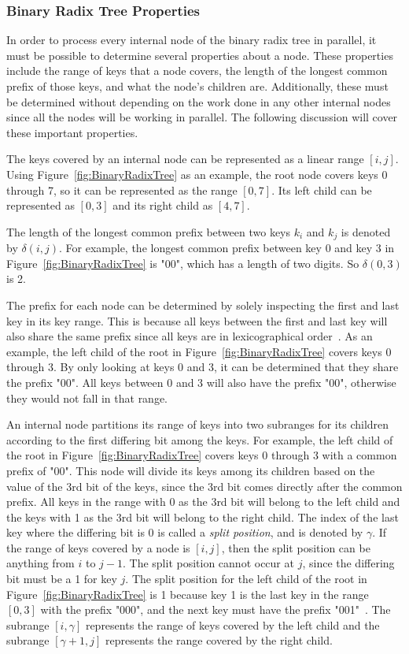 \documentclass{sig-alternate}
\begin{document}
\subsubsection{Binary Radix Tree Properties}
\label{sec:brtProperties}

In order to process every internal node of the binary radix tree in parallel, it must be possible to determine several properties about a node. These properties include the range of keys that a node covers, the length of the longest common prefix of those keys, and what the node's children are. Additionally, these must be determined without depending on the work done in any other internal nodes since all the nodes will be working in parallel. The following discussion will cover these important properties.

The keys covered by an internal node can be represented as a linear range $[i,j]$. Using Figure~\ref{fig:BinaryRadixTree} as an example, the root node covers keys 0 through 7, so it can be represented as the range $[0,7]$. Its left child can be represented as $[0,3]$ and its right child as $[4,7]$.

The length of the longest common prefix between two keys $k_{i}$ and $k_{j}$ is denoted by $\delta(i,j)$. For example, the longest common prefix between key 0 and key 3 in Figure~\ref{fig:BinaryRadixTree} is "00", which has a length of two digits. So $\delta(0,3)$ is 2.

The prefix for each node can be determined by solely inspecting the first and last key in its key range. This is because all keys between the first and last key will also share the same prefix since all keys are in lexicographical order~\cite{Karras:2012}. As an example, the left child of the root in Figure~\ref{fig:BinaryRadixTree} covers keys 0 through 3. By only looking at keys 0 and 3, it can be determined that they share the prefix "00". All keys between 0 and 3 will also have the prefix "00", otherwise they would not fall in that range.

An internal node partitions its range of keys into two subranges for its children according to the first differing bit among the keys. For example, the left child of the root in Figure~\ref{fig:BinaryRadixTree} covers keys 0 through 3 with a common prefix of "00". This node will divide its keys among its children based on the value of the 3rd bit of the keys, since the 3rd bit comes directly after the common prefix. All keys in the range with 0 as the 3rd bit will belong to the left child and the keys with 1 as the 3rd bit will belong to the right child. The index of the last key where the differing bit is 0 is called a \emph{split position}, and is denoted by $\gamma$. If the range of keys covered by a node is $[i,j]$, then the split position can be anything from $i$ to $j-1$. The split position cannot occur at $j$, since the differing bit must be a 1 for key $j$. The split position for the left child of the root in Figure~\ref{fig:BinaryRadixTree} is 1 because key 1 is the last key in the range $[0,3]$ with the prefix "000", and the next key must have the prefix "001"~\cite{Karras:2012}. The subrange $[i,\gamma]$ represents the range of keys covered by the left child and the subrange $[\gamma+1,j]$ represents the range covered by the right child.
\end{document}
